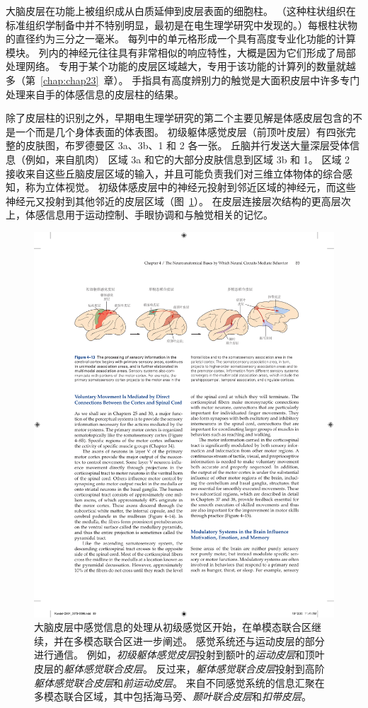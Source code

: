 大脑皮层在功能上被组织成从白质延伸到皮层表面的细胞柱。 
（这种柱状组织在标准组织学制备中并不特别明显，最初是在电生理学研究中发现的。）每根柱状物的直径约为三分之一毫米。 
每列中的单元格形成一个具有高度专业化功能的计算模块。 
列内的神经元往往具有非常相似的响应特性，大概是因为它们形成了局部处理网络。 
专用于某个功能的皮层区域越大，专用于该功能的计算列的数量就越多（第~\ref{chap:chap23}~章）。 
手指具有高度辨别力的触觉是大面积皮层中许多专门处理来自手的体感信息的皮层柱的结果。


除了皮层柱的识别之外，早期电生理学研究的第二个主要见解是体感皮层包含的不是一个而是几个身体表面的体表图。
初级躯体感觉皮层（前顶叶皮层）有四张完整的皮肤图，布罗德曼区 3a、3b、1 和 2 各一张。
丘脑并行发送大量深层受体信息（例如，来自肌肉） 区域 3a 和它的大部分皮肤信息到区域 3b 和 1。
区域 2 接收来自这些丘脑皮层区域的输入，并且可能负责我们对三维立体物体的综合感知，称为立体视觉。
初级体感皮层中的神经元投射到邻近区域的神经元，而这些神经元又投射到其他邻近的皮层区域（图~\ref{fig:4_13}）。
在皮层连接层次结构的更高层次上，体感信息用于运动控制、手眼协调和与触觉相关的记忆。


\begin{figure}[htbp]
	\centering
	\includegraphics[width=1.0\linewidth]{chap04/fig_4_13}
	\caption{大脑皮层中感觉信息的处理从初级感觉区开始，在单模态联合区继续，并在多模态联合区进一步阐述。
		感觉系统还与运动皮层的部分进行通信。
		例如，\textit{初级躯体感觉皮层}投射到额叶的\textit{运动皮层}和顶叶皮层的\textit{躯体感觉联合皮层}。
		反过来，\textit{躯体感觉联合皮层}投射到高阶\textit{躯体感觉联合皮层}和\textit{前运动皮层}。
		来自不同感觉系统的信息汇聚在多模态联合区域，其中包括海马旁、\textit{颞叶联合皮层}和\textit{扣带皮层}。}
	\label{fig:4_13}
\end{figure}


